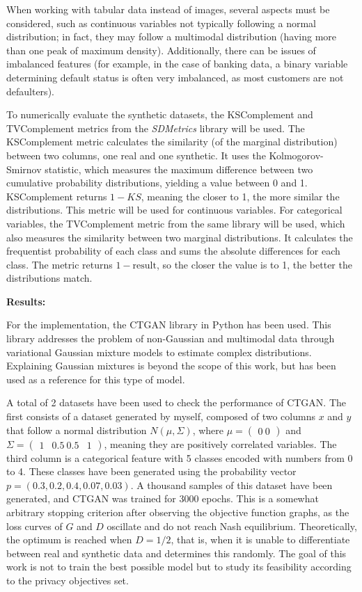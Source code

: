 When working with tabular data instead of images, several aspects must be considered, such as continuous variables not typically following a normal distribution; in fact, they may follow a multimodal distribution (having more than one peak of maximum density). Additionally, there can be issues of imbalanced features (for example, in the case of banking data, a binary variable determining default status is often very imbalanced, as most customers are not defaulters).

To numerically evaluate the synthetic datasets, the KSComplement and TVComplement metrics from the \textit{SDMetrics} library will be used. The KSComplement metric calculates the similarity (of the marginal distribution) between two columns, one real and one synthetic. It uses the Kolmogorov-Smirnov statistic, which measures the maximum difference between two cumulative probability distributions, yielding a value between 0 and 1. KSComplement returns $1-KS$, meaning the closer to 1, the more similar the distributions. This metric will be used for continuous variables. For categorical variables, the TVComplement metric from the same library will be used, which also measures the similarity between two marginal distributions. It calculates the frequentist probability of each class and sums the absolute differences for each class. The metric returns $1-\text{result}$, so the closer the value is to 1, the better the distributions match.

\textbf{Results:}

For the implementation, the CTGAN library in Python has been used. This library addresses the problem of non-Gaussian and multimodal data through variational Gaussian mixture models to estimate complex distributions. Explaining Gaussian mixtures is beyond the scope of this work, but \cite*{bishop2006} has been used as a reference for this type of model.

A total of 2 datasets have been used to check the performance of CTGAN. The first consists of a dataset generated by myself, composed of two columns $x$ and $y$ that follow a normal distribution $N(\mu, \Sigma)$, where $\mu = \begin{pmatrix}
0 \
0
\end{pmatrix}$ and $\Sigma = \begin{pmatrix}
1 & 0.5 \
0.5 & 1
\end{pmatrix}$, meaning they are positively correlated variables. The third column is a categorical feature with 5 classes encoded with numbers from 0 to 4. These classes have been generated using the probability vector $p=(0.3, 0.2, 0.4, 0.07, 0.03)$. A thousand samples of this dataset have been generated, and CTGAN was trained for 3000 epochs. This is a somewhat arbitrary stopping criterion after observing the objective function graphs, as the loss curves of $G$ and $D$ oscillate and do not reach Nash equilibrium. Theoretically, the optimum is reached when $D = 1/2$, that is, when it is unable to differentiate between real and synthetic data and determines this randomly. The goal of this work is not to train the best possible model but to study its feasibility according to the privacy objectives set.

